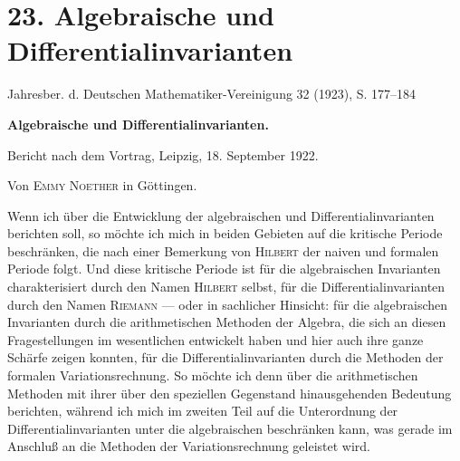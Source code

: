 \section*{23. Algebraische und Differentialinvarianten}
\begin{center}
Jahresber. d. Deutschen Mathematiker-Vereinigung 32 (1923), S. 177--184
\end{center}

\begin{center}
{\Large\bfseries Algebraische und Differentialinvarianten.}\par
\vspace{0.45em}
Bericht nach dem Vortrag, Leipzig, 18. September 1922.\par
\vspace{1.0em}
Von \textsc{Emmy Noether} in Göttingen.
\end{center}

\begingroup
\renewcommand{\thefootnote}{\arabic{footnote})}
\setcounter{footnote}{0}
\newcommand{\PXXIIIitem}[2]{\par\noindent\hangindent=2.2em\hangafter=1\makebox[2.2em][l]{#1.}#2\par}

Wenn ich über die Entwicklung der algebraischen und Differentialinvarianten berichten soll, so möchte ich mich in beiden Gebieten auf die kritische Periode beschränken, die nach einer Bemerkung von \textsc{Hilbert} der naiven und formalen Periode folgt. Und diese kritische Periode ist für die algebraischen Invarianten charakterisiert durch den Namen \textsc{Hilbert} selbst, für die Differentialinvarianten durch den Namen \textsc{Riemann} --- oder in sachlicher Hinsicht: für die algebraischen Invarianten durch die arithmetischen Methoden der Algebra, die sich an diesen Fragestellungen im wesentlichen entwickelt haben und hier auch ihre ganze Schärfe zeigen konnten, für die Differentialinvarianten durch die Methoden der formalen Variationsrechnung. So möchte ich denn über die arithmetischen Methoden mit ihrer über den speziellen Gegenstand hinausgehenden Bedeutung berichten, während ich mich im zweiten Teil auf die Unterordnung der Differentialinvarianten unter die algebraischen beschränken kann, was gerade im Anschluß an die Methoden der Variationsrechnung geleistet wird.

